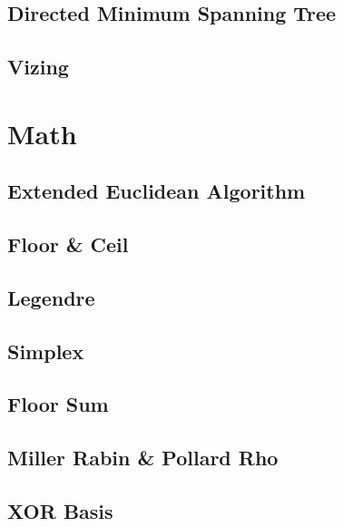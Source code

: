\documentclass{article}
\begin{document}
\subsection{Directed Minimum Spanning Tree}


\subsection{Vizing}


\section{Math}

\subsection{Extended Euclidean Algorithm}


\subsection{Floor \& Ceil}


\subsection{Legendre}


\subsection{Simplex}


\subsection{Floor Sum}


\subsection{Miller Rabin \& Pollard Rho}


\subsection{XOR Basis}

\end{document}
